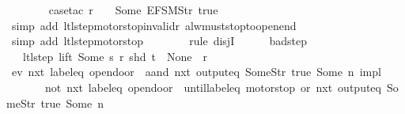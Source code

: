 \begin{isabellebody}
\ \ \ \ \ \ \isamarkupfalse%
\ {\isacharparenleft}case{\isacharunderscore}tac\ {\isachardoublequoteopen}r\ {\isachardollar}\ {}\ {\isasymnoteq}\ Some\ {\isacharparenleft}EFSM{\isachardot}Str\ {\isacharprime}{\isacharprime}true{\isacharprime}{\isacharprime}{\isacharparenright}{\isachardoublequoteclose}{\isacharparenright}\isanewline
\ \ \ \ \ \ \ \isamarkupfalse%
\ {\isacharparenleft}simp\ add{\isacharcolon}\ ltl{\isacharunderscore}step{\isacharunderscore}motorstop{\isacharunderscore}invalid{\isacharunderscore}r{}\ alw{\isacharunderscore}must{\isacharunderscore}stop{\isacharunderscore}to{\isacharunderscore}open{\isacharunderscore}end{\isacharparenright}\isanewline
\ \ \ \ \ \ \isamarkupfalse%
\ {\isacharparenleft}simp\ add{\isacharcolon}\ ltl{\isacharunderscore}step{\isacharunderscore}motorstop{\isacharparenright}\isanewline
\ \ \ \ \ \ \isamarkupfalse%
\ {\isacharparenleft}rule\ disjI{}{\isacharparenright}\isanewline
\ \ \ \ \isamarkupfalse%
%
\endisatagproof
{\isafoldproof}%
%
\isadelimproof
\isanewline
%
\endisadelimproof
\isanewline
{}\isamarkupfalse%
\ bad{\isacharunderscore}step{\isacharcolon}\isanewline
\ \ \ {\isachardoublequoteopen}ltl{\isacharunderscore}step\ lift\ {\isacharparenleft}Some\ s{\isacharparenright}\ r\ {\isacharparenleft}shd\ t{\isacharparenright}\ {\isacharequal}\ {\isacharparenleft}None{\isacharcomma}\ {\isacharbrackleft}{\isacharbrackright}{\isacharcomma}\ r{\isacharparenright}{\isachardoublequoteclose}\isanewline
{}\ {\isachardoublequoteopen}{\isacharparenleft}{\isacharparenleft}ev\ {\isacharparenleft}nxt\ {\isacharparenleft}{\isacharparenleft}label{\isacharunderscore}eq\ {\isacharprime}{\isacharprime}opendoor\ {\isacharprime}{\isacharprime}{\isacharparenright}\ aand\ {\isacharparenleft}nxt\ {\isacharparenleft}output{\isacharunderscore}eq\ {\isacharbrackleft}Some{\isacharparenleft}Str\ {\isacharprime}{\isacharprime}true{\isacharprime}{\isacharprime}{\isacharparenright}{\isacharcomma}\ Some\ n{\isacharbrackright}{\isacharparenright}{\isacharparenright}{\isacharparenright}{\isacharparenright}{\isacharparenright}\ impl\isanewline
\ \ \ \ \ \ \ {\isacharparenleft}{\isacharparenleft}not\ {\isacharparenleft}nxt\ {\isacharparenleft}label{\isacharunderscore}eq\ {\isacharprime}{\isacharprime}opendoor\ {\isacharprime}{\isacharprime}{\isacharparenright}{\isacharparenright}{\isacharparenright}\ until{\isacharparenleft}{\isacharparenleft}{\isacharparenleft}label{\isacharunderscore}eq\ {\isacharprime}{\isacharprime}motorstop{\isacharprime}{\isacharprime}{\isacharparenright}\ or\ {\isacharparenleft}nxt\ {\isacharparenleft}output{\isacharunderscore}eq\ {\isacharbrackleft}Some{\isacharparenleft}Str\ {\isacharprime}{\isacharprime}true{\isacharprime}{\isacharprime}{\isacharparenright}{\isacharcomma}\ Some\ n{\isacharbrackright}{\isacharparenright}{\isacharparenright}{\isacharparenright}{\isacharparenright}{\isacharparenright}{\isacharparenright}\isanewline

\end{isabellebody}
